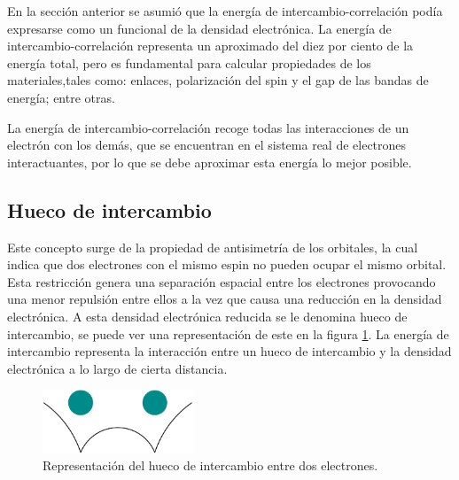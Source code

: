 En la secci\'on anterior se asumi\'o que la energ\'ia de 
intercambio-correlaci\'on  
pod\'ia expresarse como un funcional de la densidad electr\'onica. La energ\'ia 
de intercambio-correlaci\'on representa un aproximado del diez por ciento de la 
energ\'ia total, pero es fundamental para calcular propiedades de los 
materiales,tales como: enlaces, polarizaci\'on del spin y el gap de las bandas 
de energ\'ia; entre otras. 

\noindent La energ\'ia de intercambio-correlaci\'on recoge todas las 
interacciones de un 
electr\'on con los dem\'as, que se encuentran en el sistema real de electrones 
interactuantes, por lo que se debe aproximar esta energ\'ia lo mejor 
posible.


\subsection{Hueco de intercambio}

Este concepto surge de la propiedad de antisimetr\'ia de los orbitales, la cual 
indica que dos electrones con el mismo espin no pueden ocupar el mismo orbital. 
Esta restricci\'on genera una separaci\'on espacial entre los electrones 
provocando una menor repulsi\'on entre ellos a la vez que causa una reducci\'on 
en la densidad electr\'onica. A esta densidad electr\'onica reducida se le 
denomina hueco de intercambio, se puede ver una representaci\'on de este en la 
figura \ref{HuecoIntercambio}. La energ\'ia de intercambio representa la 
interacci\'on entre un hueco de intercambio y la densidad electr\'onica a lo 
largo de cierta distancia.

\begin{figure}[H]
    \centering
    \includegraphics[width=0.4\textwidth]{contenido/marco_teorico/funcional_exchange_correlation/img_exchange_correlation/HuecoIntercambio.png}
    \caption[Hueco de intercambio]{Representaci\'on del hueco de intercambio 
    entre dos electrones.}
    \label{HuecoIntercambio}
\end{figure}

